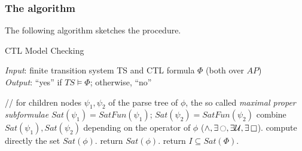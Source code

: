 \documentclass{article}
\begin{document}
\subsubsection{The algorithm}
The following algorithm sketches the procedure. 
\label{subsec-CTLmca}
\begin{algorithm}[H]
    \caption{CTL Model Checking}
    \hspace*{\algorithmicindent} \emph{Input}: finite transition system TS and CTL formula $\Phi$ (both over $AP$) \\
    \hspace*{\algorithmicindent} \emph{Output}: ``yes'' if $TS \vDash \Phi$; otherwise, ``no''
    \begin{algorithmic}[1]
            \State // for children nodes $\psi_1, \psi_2$ of the parse tree of $\phi$, the so called \emph{maximal proper subformulae}
            \State $Sat(\psi_1) = SatFun(\psi_1)$; $Sat(\psi_2) = SatFun(\psi_2)$ 
            \State combine $Sat(\psi_1), Sat(\psi_2)$ depending on the operator of $\phi$ ($\land, \exists\mathop{\ocircle}, \exists\mathbin{\mathcal{U}}, \exists\mathop{\square}$).
        \Else
            \State compute directly the set $Sat(\phi)$.
        \EndIf
        \State return $Sat(\phi)$.
    \EndFunction
    \State return $I \subseteq Sat(\Phi)$.
    \end{algorithmic}
\end{algorithm}
\end{document}
